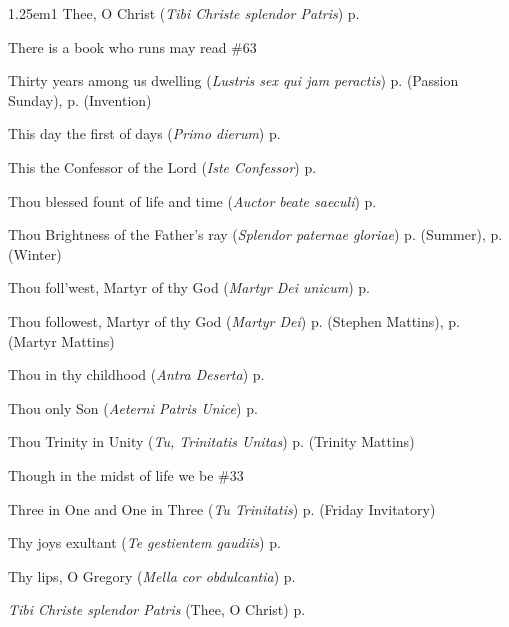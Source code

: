 \begin{hangparas}{1.25em}{1}
Thee, O Christ (\textit{Tibi Christe splendor Patris}) \dotfill p. \pageref{MichaelEvensong}
\par\noindent
There is a book who runs may read \dotfill \#63
\par\noindent
Thirty years among us dwelling (\textit{Lustris sex qui jam peractis}) \dotfill p. \pageref{PassionMattinsHymn} (Passion Sunday), p. \pageref{InventionMattins} (Invention)
\par\noindent
This day the first of days (\textit{Primo dierum}) \dotfill p. \pageref{SundayInvitatoryWinter}
\par\noindent
This the Confessor of the Lord (\textit{Iste Confessor}) \dotfill p. \pageref{ConfessorBishopEvensong}
\par\noindent
Thou blessed fount of life and time (\textit{Auctor beate saeculi}) \dotfill p. \pageref{CompassionEvensongHymn}
\par\noindent
Thou Brightness of the Father's ray (\textit{Splendor paternae gloriae}) \dotfill p. \pageref{MondayMattinsSummer} (Summer), p. \pageref{MondayMattinsWinter} (Winter)
\par\noindent
Thou foll'west, Martyr of thy God (\textit{Martyr Dei unicum}) \dotfill p. \pageref{MartyrMattinsEaster}
\par\noindent
Thou followest, Martyr of thy God (\textit{Martyr Dei}) \dotfill p. \pageref{StephenMattins} (Stephen Mattins), p. \pageref{MartyrMattins} (Martyr Mattins)
\par\noindent
Thou in thy childhood (\textit{Antra Deserta}) \dotfill p. \pageref{JohnBaptistInvitatory}
\par\noindent
Thou only Son (\textit{Aeterni Patris Unice}) \dotfill p. \pageref{MaryMagdaleneMattins}
\par\noindent
Thou Trinity in Unity (\textit{Tu, Trinitatis Unitas}) \dotfill p. \pageref{TrinityMattins} (Trinity Mattins)
\par\noindent
Though in the midst of life we be \dotfill \#33
\par\noindent
Three in One and One in Three (\textit{Tu Trinitatis}) \dotfill p. \pageref{FridayInvitatory} (Friday Invitatory)
\par\noindent
Thy joys exultant (\textit{Te gestientem gaudiis}) \dotfill p. \pageref{HolyRosaryIIEvensong}
\par\noindent
Thy lips, O Gregory (\textit{Mella cor obdulcantia}) \dotfill p. \pageref{GregoryMattins}
\par\noindent
\textit{Tibi Christe splendor Patris} (Thee, O Christ) \dotfill p. \pageref{MichaelEvensong}

\end{hangparas}
